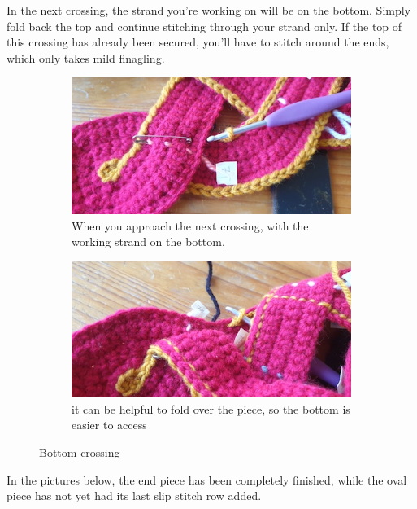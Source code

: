 \documentclass[openany]{book}
\begin{document}
In the next crossing, the strand you're working on will be on the bottom. Simply fold back the top and continue stitching through your strand only. If the top of this crossing has already been secured, you'll have to stitch around the ends, which only takes mild finagling.


\begin{figure}[H]\centering
\begin{subfigure}[t]{.45\textwidth}\centering
\includegraphics[width=.95\textwidth]{bk/under1}
\caption{When you approach the next crossing, with the working strand on the bottom,}
\end{subfigure}
%
\begin{subfigure}[t]{.45\textwidth}
		\centering
		\includegraphics[width=.95\textwidth]{bk/under2}
\caption{it can be helpful to fold over the piece, so the bottom is easier to access}
\end{subfigure}
\caption{Bottom crossing}
\end{figure}

In the pictures below, the end piece has been completely finished, while the oval piece has not yet had its last slip stitch row added.
\end{document}
